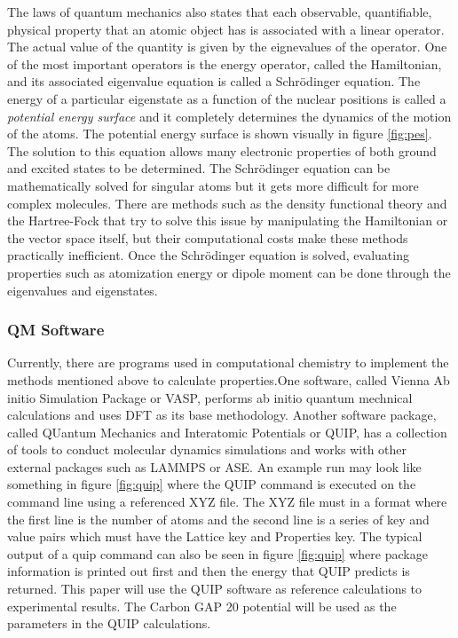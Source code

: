 \documentclass[12pt, abstract = true]{scrartcl}
\begin{document}
The laws of quantum mechanics also states that each observable, quantifiable, physical property that 
an atomic object has is associated with a linear operator. The actual value of the quantity is given 
by the eignevalues of the operator. One of the most important operators is the energy operator, called 
the Hamiltonian, and its associated eigenvalue equation is called a Schrödinger equation. The energy of 
a particular eigenstate as a function of the nuclear positions is called a \emph{potential energy surface}
and it completely determines the dynamics of the motion of the atoms. The potential energy surface is shown visually in figure \ref{fig:pes}. The solution to this equation  allows many electronic properties of both 
ground and excited states to be determined. The Schrödinger equation can be mathematically solved for 
singular atoms but it gets more difficult for more complex molecules. There are methods such as the density 
functional theory and the Hartree-Fock that try to solve this issue by manipulating the Hamiltonian or the vector space itself, but their computational costs make these methods practically inefficient. Once the Schrödinger 
equation is solved, evaluating properties such as atomization energy or dipole moment can be done 
through the eigenvalues and eigenstates.

\subsubsection{QM Software} 

Currently, there are programs used in computational chemistry to implement the methods mentioned above to 
calculate properties.One software, called Vienna Ab initio Simulation Package or VASP, performs ab initio 
quantum mechnical calculations and uses DFT as its base methodology. Another software package, called 
QUantum Mechanics and Interatomic Potentials or QUIP\cite{quip}, has a collection of tools to conduct 
molecular dynamics simulations and works with other external packages such as LAMMPS or ASE. An example run may look like something in figure \ref{fig:quip} where the QUIP command is executed on the command line using a referenced XYZ file. The XYZ file must in a format where the first line is the number of atoms and the second line is a series of key and value pairs which must have the Lattice key and Properties key. The typical output of a quip command can also be seen in figure \ref{fig:quip} where package information is printed out first and then the energy that QUIP predicts is returned. This paper 
will use the QUIP software as reference calculations to experimental results. The Carbon GAP 20 
potential\cite{gap20} will be used as the parameters in the QUIP calculations.
\end{document}

